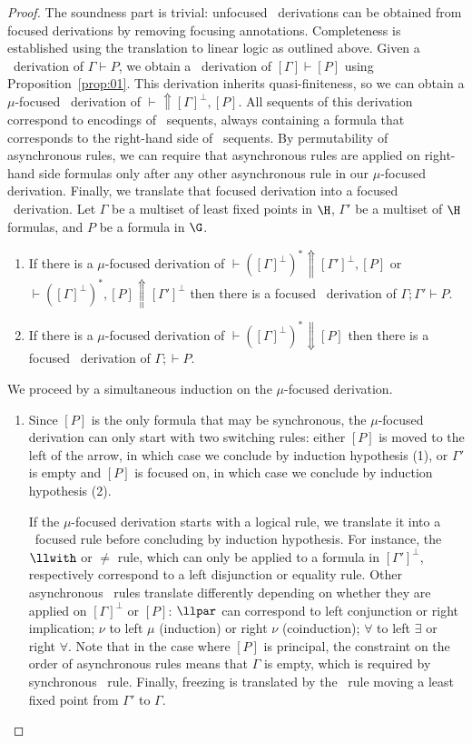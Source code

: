 \begin{proof}
The soundness part is trivial: unfocused \muLJL\ derivations can be
obtained from focused derivations by removing focusing annotations.
Completeness is established using the translation to linear logic
as outlined above.
Given a \muLJL\ derivation of $\Gamma\vdash P$,
we obtain a \mumall\ derivation of $[\Gamma]\vdash [P]$ using
Proposition~\ref{prop:01}.
This derivation inherits quasi-finiteness,
so we can obtain a $\mu$-focused \mumall\ derivation
of $\vdash \Uparrow [\Gamma]^\perp, [P]$.
All sequents of this derivation correspond to encodings of \muLJL\ sequents,
always containing a formula that corresponds to the right-hand side
of \muLJL\ sequents.
By permutability of asynchronous rules,
we can require that asynchronous rules are applied on right-hand side
formulas only after any other asynchronous rule in our $\mu$-focused derivation.
Finally, we translate that focused derivation into a focused
\muLJL\ derivation.
Let $\Gamma$ be a multiset of least fixed points in $\H$,
$\Gamma'$ be a multiset of $\H$ formulas,
and $P$ be a formula in $\G$.
\begin{enumerate}
\item
  If there is a $\mu$-focused derivation of
  $\vdash ([\Gamma]^\perp)^* \Uparrow [\Gamma']^\perp, [P]$
  or $\vdash ([\Gamma]^\perp)^*,  [P] \Uparrow [\Gamma']^\perp$
  then there is a focused \muLJL\ derivation of
  $\Gamma;\Gamma'\vdash P$.
\item
  If there is a $\mu$-focused derivation of
  $\vdash ([\Gamma]^\perp)^* \Downarrow [P]$
  then there is a focused \muLJL\ derivation of $\Gamma;\vdash P$.
\end{enumerate}
We proceed by a simultaneous induction on the $\mu$-focused derivation.
\begin{enumerate}
\item
  Since $[P]$ is the only formula that may be synchronous,
  the $\mu$-focused derivation can only start with two switching rules:
  either $[P]$ is moved to the left of the arrow, in which case
  we conclude by induction hypothesis (1),
  or $\Gamma'$ is empty and $[P]$ is focused on, in which case
  we conclude by induction hypothesis (2).

  If the $\mu$-focused derivation starts with a logical rule,
  we translate it into a \muLJL\ focused rule before concluding by
  induction hypothesis.
  For instance, the $\llwith$ or $\neq$ rule, which can only be
  applied to a formula in $[\Gamma']^\perp$, respectively correspond
  to a left disjunction or equality rule.
  Other asynchronous \mumall\ rules translate differently depending
  on whether they are applied on $[\Gamma]^\perp$ or $[P]$:
  $\llpar$ can correspond to left conjunction or right implication;
  $\nu$ to left $\mu$ (induction) or right $\nu$ (coinduction);
  $\forall$ to left $\exists$ or right $\forall$.
  Note that in the case where $[P]$ is principal, the constraint on
  the order of asynchronous rules means that $\Gamma$ is empty,
  which is required by synchronous \muLJL\ rule.
  Finally, freezing is translated by the \muLJL\ rule
  moving a least fixed point from $\Gamma'$ to $\Gamma$.


\end{enumerate}
\end{proof}

